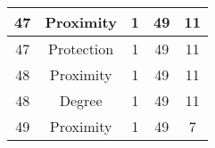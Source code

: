 \documentclass[results.tex]{subfiles}
\begin{document}
\begin{center}
\begin{tabular}{| c || c | c | c | c |}
            \hline
            47                      & Proximity                    & 1                      & 49                      & 11                   \\
            \hline
            47                      & Protection                   & 1                      & 49                      & 11                   \\
            \hline
            48                      & Proximity                    & 1                      & 49                      & 11                   \\
            \hline
            48                      & Degree                       & 1                      & 49                      & 11                   \\
            \hline
            49                      & Proximity                    & 1                      & 49                      & 7                    \\
            \hline
        \end{tabular}
    \end{center}
\end{document}
